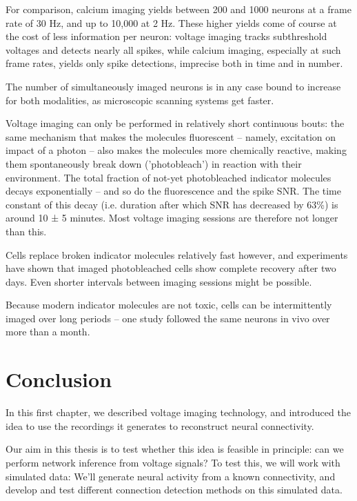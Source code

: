 For comparison, calcium imaging yields between 200 and 1000 neurons at a frame rate of 30 Hz, and up to 10,000 at 2 Hz.\cite{Pachitariu2017Suite2p10000} These higher yields come of course at the cost of less information per neuron: voltage imaging tracks subthreshold voltages and detects nearly all spikes, while calcium imaging, especially at such frame rates, yields only spike detections, imprecise both in time and in number.

The number of simultaneously imaged neurons is in any case bound to increase for both modalities, as microscopic scanning systems get faster.

Voltage imaging can only be performed in relatively short continuous bouts: the same mechanism that makes the molecules fluorescent -- namely, excitation on impact of a photon -- also makes the molecules more chemically reactive, making them spontaneously break down ('photobleach') in reaction with their environment. The total fraction of not-yet photobleached indicator molecules decays exponentially -- and so do the fluorescence and the spike SNR. The time constant of this decay (i.e. duration after which SNR has decreased by 63\%) is around 10 ± 5 minutes.\cite{Piatkevich2019PopulationImagingNeural,Abdelfattah2019BrightPhotostableChemigenetic} Most voltage imaging sessions are therefore not longer than this.

Cells replace broken indicator molecules relatively fast however, and experiments have shown that imaged photobleached cells show complete recovery after two days. Even shorter intervals between imaging sessions might be possible.

Because modern indicator molecules are not toxic, cells can be intermittently imaged over long periods -- one study followed the same neurons in vivo over more than a month.



\section{Conclusion}

In this first chapter, we described voltage imaging technology, and introduced the idea to use the recordings it generates to reconstruct neural connectivity.

Our aim in this thesis is to test whether this idea is feasible in principle: can we perform network inference from voltage signals? To test this, we will work with simulated data: We'll generate neural activity from a known connectivity, and develop and test different connection detection methods on this simulated data.

